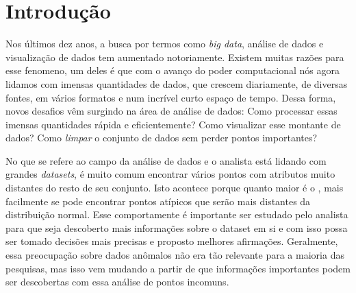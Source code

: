 \chapter{Introdução}





Nos últimos dez anos, a busca por termos como \textit{big data}, análise de dados e visualização de dados tem aumentado notoriamente. Existem muitas razões para esse fenomeno, um deles é que com o avanço do poder computacional nós agora lidamos com imensas quantidades de dados, que crescem diariamente, de diversas fontes, em vários formatos e num incrível curto espaço de tempo. Dessa forma, novos desafios vêm surgindo na área de análise de dados: Como processar essas imensas quantidades rápida e eficientemente? Como visualizar esse montante de dados? Como \textit{limpar} o conjunto de dados sem perder pontos importantes?


No que se refere ao campo da análise de dados e o analista está lidando com grandes \textit{datasets}, é muito comum encontrar vários pontos com atributos muito distantes do resto de seu conjunto. Isto acontece porque quanto maior é o , mais facilmente se pode encontrar pontos atípicos que serão mais distantes da distribuição normal. Esse comportamente é importante ser estudado pelo analista para que seja descoberto mais informações sobre o dataset em si e com isso possa ser tomado decisões mais precisas e proposto melhores afirmações. Geralmente, essa preocupação sobre dados anômalos não era tão relevante para a maioria das pesquisas, mas isso vem mudando a partir de que informações importantes podem ser descobertas com essa análise de pontos incomuns.

